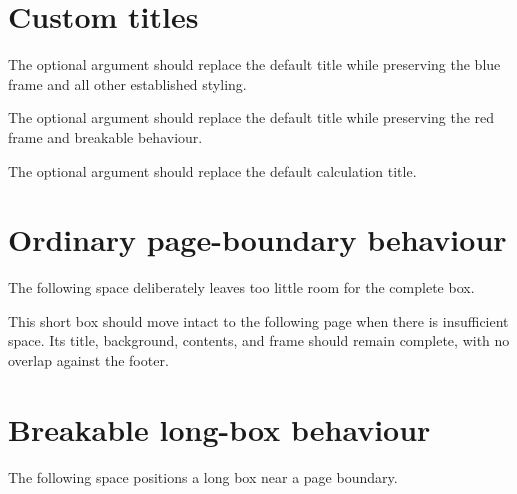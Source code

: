 \documentclass{otengineering}
\begin{document}
\section{Custom titles}

\begin{idea}
    The optional argument should replace the default title while preserving
    the blue frame and all other established styling.
\end{idea}

\begin{failure}
    The optional argument should replace the default title while preserving
    the red frame and breakable behaviour.
\end{failure}

\begin{calculation}
    The optional argument should replace the default calculation title.

\end{calculation}

\clearpage
\section{Ordinary page-boundary behaviour}

The following space deliberately leaves too little room for the complete
box.

\rule{0pt}{0.92\textheight}

\begin{decision}
    This short box should move intact to the following page when there is
    insufficient space. Its title, background, contents, and frame should
    remain complete, with no overlap against the footer.
\end{decision}

\clearpage
\section{Breakable long-box behaviour}

The following space positions a long box near a page boundary.
\end{document}
